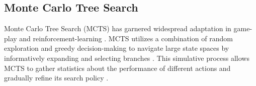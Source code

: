 \documentclass[runningheads]{llncs}
\begin{document}




\subsection{Monte Carlo Tree Search}\label{subsec:MonteCarlo TreeSearch}

Monte Carlo Tree Search (MCTS) has garnered widespread adaptation in game-play and reinforcement-learning \cite{Silver2016} \cite{Swiechowski2023}. MCTS utilizes a combination of random exploration and greedy decision-making to navigate large state spaces by informatively expanding and selecting branches \cite{Swiechowski2023}. This simulative process allows MCTS to gather statistics about the performance of different actions and gradually refine its search policy \cite{Swiechowski2023}.
\end{document}
